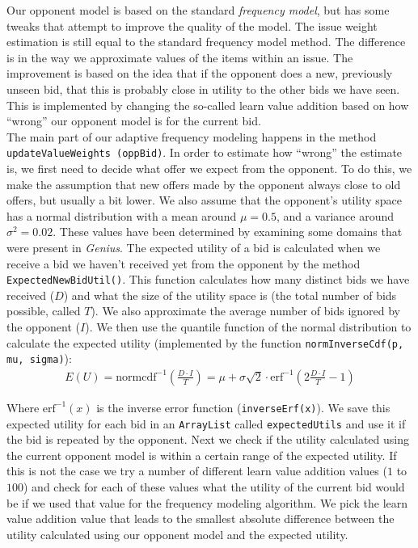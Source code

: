 Our opponent model is based on the standard \emph{frequency model}, but has some tweaks that attempt to improve the quality of the model. The issue weight estimation is still equal to the standard frequency model method. The difference is in the way we approximate values of the items within an issue. The improvement is based on the idea that if the opponent does a new, previously unseen bid, that this is probably close in utility to the other bids we have seen. This is implemented by changing the so-called learn value addition based on how ``wrong'' our opponent model is for the current bid. \\

The main part of our adaptive frequency modeling happens in the method \texttt{updateValueWeights (oppBid)}.
In order to estimate how ``wrong'' the estimate is, we first need to decide what offer we expect from the opponent.
To do this, we make the assumption that new offers made by the opponent always close to old offers, but usually a bit lower. 
We also assume that the opponent's utility space has a normal distribution with a mean around $\mu = 0.5$, and a variance around $\sigma^2 = 0.02$. 
These values have been determined by examining some domains that were present in \textit{Genius}. 
The expected utility of a bid is calculated when we receive a bid we haven't received yet from the opponent by the method \verb-ExpectedNewBidUtil()-. This function calculates how many distinct bids we have received ($D$) and what the size of the utility space is (the total number of bids possible, called $T$). We also approximate the average number of bids ignored by the opponent ($I$). We then use the quantile function of the normal distribution to calculate the expected utility (implemented by the function \verb-normInverseCdf(p, mu, sigma)-):
\begin{align}
  E(U) = \text{normcdf}^{-1} \left(\frac{D \cdot I}{T}\right) = \mu + \sigma \sqrt{2} \cdot \text{erf}^{-1} \left(2 \frac{D \cdot I}{T} - 1\right)
\end{align}

Where $\text{erf}^{-1}(x)$ is the inverse error function (\verb-inverseErf(x)-). 
We save this expected utility for each bid in an \verb-ArrayList- called \verb-expectedUtils- and use it if the bid is repeated by the opponent. 
Next we check if the utility calculated using the current opponent model is within a certain range of the expected utility. 
If this is not the case we try a number of different learn value addition values ($1$ to $100$) and check for each of these values what the utility of the current bid would be if we used that value for the frequency modeling algorithm. 
We pick the learn value addition value that leads to the smallest absolute difference between the utility calculated using our opponent model and the expected utility. \\

